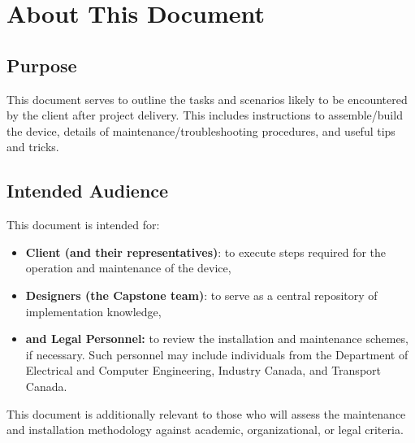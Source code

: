 \documentclass[10pt,letterpaper]{article}
\begin{document}


\section{About This Document}

\subsection{Purpose}
This document serves to outline the tasks and scenarios likely to be encountered by the client after project delivery. This includes instructions to assemble/build the device, details of maintenance/troubleshooting procedures, and useful tips and tricks. 

\subsection{Intended Audience}
This document is intended for:
\begin{itemize}
\item \textbf{Client (and their representatives)}: to execute steps required for the operation and maintenance of the device,
\item \textbf{Designers (the Capstone team)}: to serve as a central repository of implementation knowledge,
\item \textbf{and Legal Personnel:} to review the installation and maintenance schemes, if necessary. Such personnel may include individuals from the Department of Electrical and Computer Engineering, Industry Canada, and Transport Canada.
\end{itemize}

This document is additionally relevant to those who will assess the maintenance and installation methodology against academic, organizational, or legal criteria.
\end{document}
